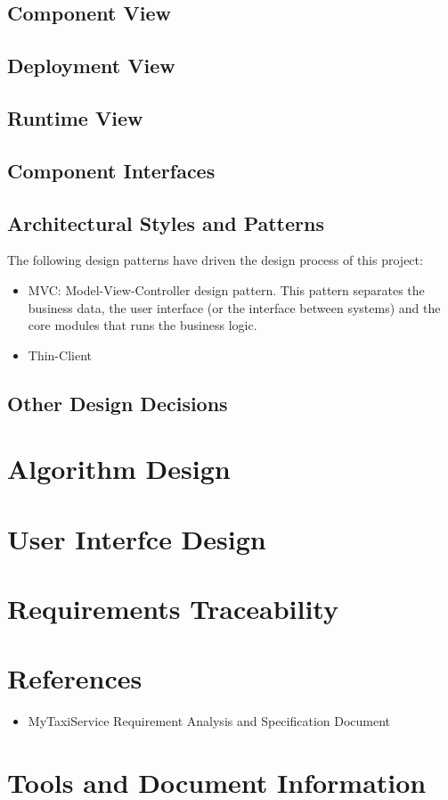 \documentclass[11pt, a4paper,titlepage]{article}
\newcommand{\productname}{MyTaxiService }
\begin{document}
\subsection{Component View}
\subsection{Deployment View}
\subsection{Runtime View}
\subsection{Component Interfaces}
\subsection{Architectural Styles and Patterns}
	The following design patterns have driven the design process of this project:
	\begin{itemize}
		\item MVC: Model-View-Controller design pattern. This pattern separates the business data, the user interface (or the interface between systems) and the core modules that runs the business logic. 
		\item Thin-Client
	\end{itemize}
\subsection{Other Design Decisions}
\section{Algorithm Design}
\section{User Interfce Design}
\section{Requirements Traceability}
\section{References}
\begin{itemize}
	\item \productname Requirement Analysis and Specification Document
\end{itemize}
\section{Tools and Document Information}
\end{document}
